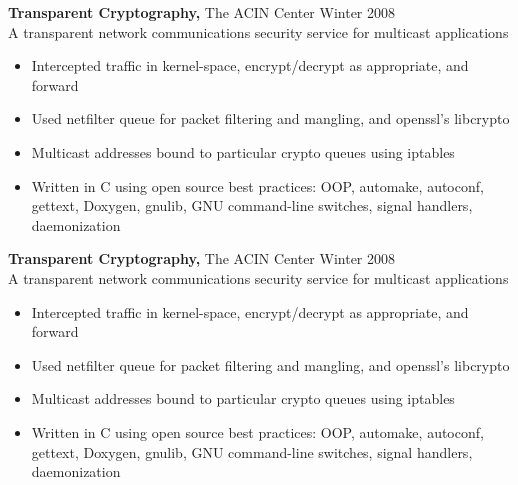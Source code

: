 \documentclass[margin]{res}
\begin{document}
\begin{resume}
\begin{tech}
{\bf Transparent Cryptography,} The ACIN Center \hfill Winter 2008 \\
A transparent network communications security service for multicast applications
\begin{itemize} \itemsep -2pt %
\item Intercepted traffic in kernel-space, encrypt/decrypt as appropriate, and forward
\item Used netfilter queue for packet filtering and mangling, and openssl's libcrypto
\item Multicast addresses bound to particular crypto queues using iptables
\item Written in C using open source best practices: OOP, automake, autoconf, gettext, Doxygen, gnulib, GNU command-line switches, signal handlers, daemonization
\end{itemize}
\end{tech}
\begin{general}
{\bf Transparent Cryptography,} The ACIN Center \hfill Winter 2008 \\
A transparent network communications security service for multicast applications
\begin{itemize} \itemsep -2pt %
\item Intercepted traffic in kernel-space, encrypt/decrypt as appropriate, and forward
\item Used netfilter queue for packet filtering and mangling, and openssl's libcrypto
\item Multicast addresses bound to particular crypto queues using iptables
\item Written in C using open source best practices: OOP, automake, autoconf, gettext, Doxygen, gnulib, GNU command-line switches, signal handlers, daemonization
\end{itemize}
\end{general}



\end{resume}
\end{document}
